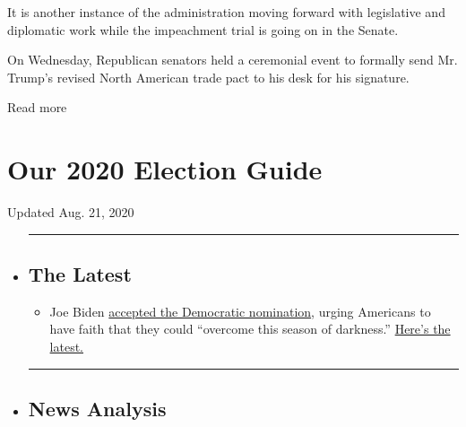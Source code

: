 It is another instance of the administration moving forward with
legislative and diplomatic work while the impeachment trial is going on
in the Senate.

On Wednesday, Republican senators held a ceremonial event to formally
send Mr. Trump's revised North American trade pact to his desk for his
signature.

Read more

\hypertarget{our-2020-election-guide}{%
\section{Our 2020 Election Guide}\label{our-2020-election-guide}}

Updated Aug. 21, 2020

\begin{itemize}
\item
  \begin{center}\rule{0.5\linewidth}{\linethickness}\end{center}

  \hypertarget{the-latest}{%
  \subsection{The Latest}\label{the-latest}}

  \begin{itemize}
  \tightlist
  \item
    Joe Biden
    \href{https://www.nytimes3xbfgragh.onion/live/2020/08/21/us/dnc-convention-election?action=click\&pgtype=Article\&state=default\&region=BELOW_MAIN_CONTENT\&context=storylines_guide}{accepted
    the Democratic nomination}, urging Americans to have faith that they
    could ``overcome this season of darkness.''
    \href{https://www.nytimes3xbfgragh.onion/live/2020/08/21/us/dnc-convention-election?action=click\&pgtype=Article\&state=default\&region=BELOW_MAIN_CONTENT\&context=storylines_guide}{Here's
    the latest.}
  \end{itemize}
\item
  \begin{center}\rule{0.5\linewidth}{\linethickness}\end{center}

  \hypertarget{news-analysis}{%
  \subsection{News Analysis}\label{news-analysis}}


\end{itemize}
